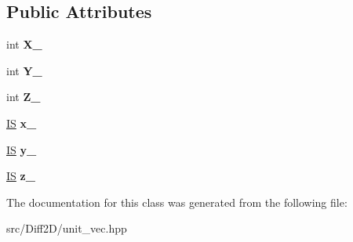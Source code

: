 \subsection*{Public Attributes}
\begin{DoxyCompactItemize}
\item 
\hypertarget{classLocalCoor_a7d72e3489aaf1b6579f7a3e0f5b30e26}{int {\bfseries X\-\_\-}}\label{classLocalCoor_a7d72e3489aaf1b6579f7a3e0f5b30e26}

\item 
\hypertarget{classLocalCoor_a5ff6668d5d6898582ddfdc5eadce58ff}{int {\bfseries Y\-\_\-}}\label{classLocalCoor_a5ff6668d5d6898582ddfdc5eadce58ff}

\item 
\hypertarget{classLocalCoor_acd97c2eb7e3b994dbc58ae98ab785280}{int {\bfseries Z\-\_\-}}\label{classLocalCoor_acd97c2eb7e3b994dbc58ae98ab785280}

\item 
\hypertarget{classLocalCoor_a2c0e974fc45c597f893b20a0c2f6869c}{\hyperlink{structIS}{I\-S} {\bfseries x\-\_\-}}\label{classLocalCoor_a2c0e974fc45c597f893b20a0c2f6869c}

\item 
\hypertarget{classLocalCoor_a58678d9cfb17db349a9d7fd70a2d5150}{\hyperlink{structIS}{I\-S} {\bfseries y\-\_\-}}\label{classLocalCoor_a58678d9cfb17db349a9d7fd70a2d5150}

\item 
\hypertarget{classLocalCoor_acdd6d24c450a43fd755f2e43d16d9991}{\hyperlink{structIS}{I\-S} {\bfseries z\-\_\-}}\label{classLocalCoor_acdd6d24c450a43fd755f2e43d16d9991}

\end{DoxyCompactItemize}


The documentation for this class was generated from the following file\-:\begin{DoxyCompactItemize}
\item 
src/\-Diff2\-D/unit\-\_\-vec.\-hpp\end{DoxyCompactItemize}
